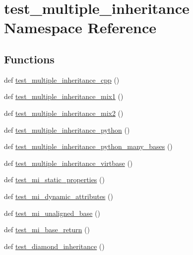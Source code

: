 \hypertarget{namespacetest__multiple__inheritance}{}\section{test\+\_\+multiple\+\_\+inheritance Namespace Reference}
\label{namespacetest__multiple__inheritance}
\subsection*{Functions}
\begin{DoxyCompactItemize}
\item 
def \mbox{\hyperlink{namespacetest__multiple__inheritance_ae51113ccaa1d6e777f30ef047f488289}{test\+\_\+multiple\+\_\+inheritance\+\_\+cpp}} ()
\item 
def \mbox{\hyperlink{namespacetest__multiple__inheritance_a9ebd5c05b4eb435f7e9e206612b576c7}{test\+\_\+multiple\+\_\+inheritance\+\_\+mix1}} ()
\item 
def \mbox{\hyperlink{namespacetest__multiple__inheritance_a143d815c3f417d46702969c5ee43a852}{test\+\_\+multiple\+\_\+inheritance\+\_\+mix2}} ()
\item 
def \mbox{\hyperlink{namespacetest__multiple__inheritance_a7e616cd5bc6911067c96bc485cc44520}{test\+\_\+multiple\+\_\+inheritance\+\_\+python}} ()
\item 
def \mbox{\hyperlink{namespacetest__multiple__inheritance_af504da7bfeaf1d3d81cf43d0ecde272c}{test\+\_\+multiple\+\_\+inheritance\+\_\+python\+\_\+many\+\_\+bases}} ()
\item 
def \mbox{\hyperlink{namespacetest__multiple__inheritance_acd0623a17a4f012476bbe426c90e865e}{test\+\_\+multiple\+\_\+inheritance\+\_\+virtbase}} ()
\item 
def \mbox{\hyperlink{namespacetest__multiple__inheritance_a0cff8c53411614a99a405ec39cebbd56}{test\+\_\+mi\+\_\+static\+\_\+properties}} ()
\item 
def \mbox{\hyperlink{namespacetest__multiple__inheritance_ae863448e90221d83008bdf6befc6ffbb}{test\+\_\+mi\+\_\+dynamic\+\_\+attributes}} ()
\item 
def \mbox{\hyperlink{namespacetest__multiple__inheritance_a70c8938038ff5bd7836b7a825272f803}{test\+\_\+mi\+\_\+unaligned\+\_\+base}} ()
\item 
def \mbox{\hyperlink{namespacetest__multiple__inheritance_a6be3ec6de4e5bae52272d900f3fe7514}{test\+\_\+mi\+\_\+base\+\_\+return}} ()
\item 
def \mbox{\hyperlink{namespacetest__multiple__inheritance_aca545c36aa49643c2628d8c76a6b40be}{test\+\_\+diamond\+\_\+inheritance}} ()
\end{DoxyCompactItemize}
